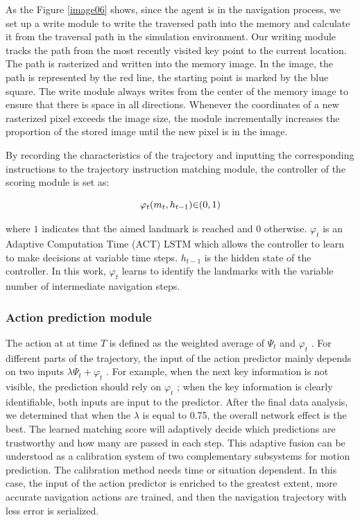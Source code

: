 As the Figure \ref{image06} shows, since the agent is in the navigation process, we set up a write module to write the traversed path into the memory and calculate it from the traversal path in the simulation environment. Our writing module tracks the path from the most recently visited key point to the current location. The path is rasterized and written into the memory image. In the image, the path is represented by the red line, the starting point is marked by the blue square. The write module always writes from the center of the memory image to ensure that there is space in all directions. Whenever the coordinates of a new rasterized pixel exceeds the image size, the module incrementally increases the proportion of the stored image until the new pixel is in the image.

By recording the characteristics of the trajectory and inputting the corresponding instructions to the trajectory instruction matching module, the controller of the scoring module is set as:

\begin{equation}
	\centering
	{\varphi}_{t}({m}_{t},{h}_{t-1}){\in}{({0},{1})}
\end{equation}

where ${1}$ indicates that the aimed landmark is reached and ${0}$ otherwise. ${{\varphi}_{t}}$ is an Adaptive Computation Time (ACT) LSTM which allows the controller to learn to make decisions at variable time steps. ${h}_{t-1}$ is the hidden state of the controller. In this work, ${{\varphi}_{t}}$ learns to identify the landmarks with the variable number of intermediate navigation steps.

\subsubsection{Action prediction module}
	
The action at at time ${T}$ is defined as the weighted average of ${{\Psi}_{t}}$ and ${{\varphi}_{t}}$ . For different parts of the trajectory, the input of the action predictor mainly depends on  two inputs ${{\lambda}{\Psi}_{t} + {\varphi}_{t}}$ . For example, when the next key information is not visible, the prediction should rely on ${{\varphi}_{t}}$ ; when the key information is clearly identifiable, both inputs are input to the predictor. After the final data analysis, we determined that when the ${\lambda}$  is equal to 0.75, the overall network effect is the best. The learned matching score will adaptively decide which predictions are trustworthy and how many are passed in each step. This adaptive fusion can be understood as a calibration system of two complementary subsystems for motion prediction. The calibration method needs time or situation dependent. In this case, the input of the action predictor is enriched to the greatest extent, more accurate navigation actions are trained, and then the navigation trajectory with less error is serialized.
	
